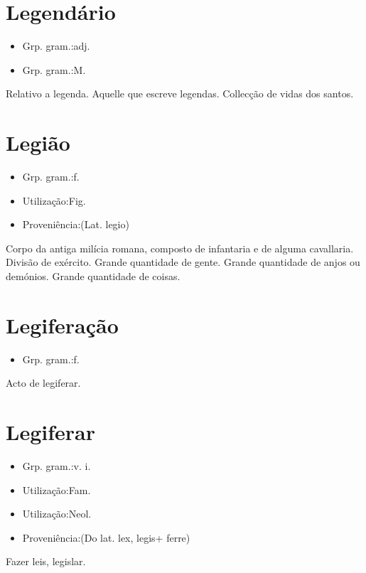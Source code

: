\section{Legendário}
\begin{itemize}
\item {Grp. gram.:adj.}
\end{itemize}
\begin{itemize}
\item {Grp. gram.:M.}
\end{itemize}
Relativo a legenda.
Aquelle que escreve legendas.
Collecção de vidas dos santos.
\section{Legião}
\begin{itemize}
\item {Grp. gram.:f.}
\end{itemize}
\begin{itemize}
\item {Utilização:Fig.}
\end{itemize}
\begin{itemize}
\item {Proveniência:(Lat. \textunderscore legio\textunderscore )}
\end{itemize}
Corpo da antiga milícia romana, composto de infantaria e de alguma cavallaria.
Divisão de exército.
Grande quantidade de gente.
Grande quantidade de anjos ou demónios.
Grande quantidade de coisas.
\section{Legiferação}
\begin{itemize}
\item {Grp. gram.:f.}
\end{itemize}
Acto de legiferar.
\section{Legiferar}
\begin{itemize}
\item {Grp. gram.:v. i.}
\end{itemize}
\begin{itemize}
\item {Utilização:Fam.}
\end{itemize}
\begin{itemize}
\item {Utilização:Neol.}
\end{itemize}
\begin{itemize}
\item {Proveniência:(Do lat. \textunderscore lex\textunderscore , \textunderscore legis\textunderscore  + \textunderscore ferre\textunderscore )}
\end{itemize}
Fazer leis, legislar.
